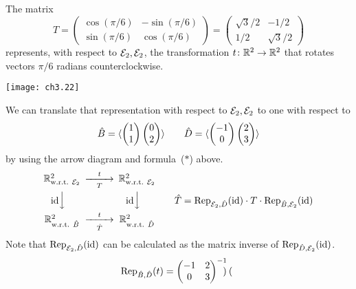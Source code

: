 \begin{example}
The matrix
\begin{equation*}
  T=\begin{pmatrix}
     \cos(\pi/6)  &-\sin(\pi/6)  \\
     \sin(\pi/6)  &\cos(\pi/6)
  \end{pmatrix}
  =
  \begin{pmatrix}
     \sqrt{3}/2  &-1/2  \\
     1/2         &\sqrt{3}/2
  \end{pmatrix}
\end{equation*}
represents, with respect to \( \stdbasis_2,\stdbasis_2 \),
the transformation \( \map{t}{\Re^2}{\Re^2} \) that rotates vectors
\( \pi/6 \) radians counterclockwise.
\begin{center}
  \texttt{[image: ch3.22]}
\end{center}
We can translate that representation with respect to $\stdbasis_2,\stdbasis_2$ 
to one with respect to
\begin{equation*}
  \hat{B}=\sequence{
              \colvec{1 \\ 1}
              \colvec{0 \\ 2} }
  \qquad
  \hat{D}=\sequence{
              \colvec{-1 \\ 0}
              \colvec{2 \\ 3} }
\end{equation*}
by using the arrow diagram and formula~($*$) above.
\begin{equation*}
  \begin{CD}
    \Re^2_\wrt{\stdbasis_2}              @>t>T>        \Re^2_\wrt{\stdbasis_2}       \\
    @V\scriptstyle\identity VV                @V\scriptstyle\identity VV \\
    \Re^2_\wrt{\hat{B}}          @>t>\hat{T}>  \Re^2_\wrt{\hat{D}}
  \end{CD}
  \qquad
   \hat{T}=
   \rep{\identity}{\stdbasis_2,\hat{D}}\cdot T\cdot \rep{\identity}{\hat{B},\stdbasis_2}
\end{equation*}
Note that $\rep{\identity}{\stdbasis_2,\hat{D}}$ can be calculated as
the matrix inverse of $\rep{\identity}{\hat{D},\stdbasis_2}$.
\begin{align*}
   \rep{t}{\hat{B},\hat{D}}
  &=\begin{pmatrix}
     -1     &2   \\
     0      &3
  \end{pmatrix}^{-1}
  \begin{pmatrix}

\end{pmatrix}
\end{align*}
\end{example}
